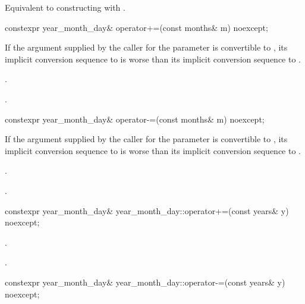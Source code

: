 \begin{itemdescr}
\pnum
\effects
Equivalent to constructing with .
\end{itemdescr}

%
\begin{itemdecl}
constexpr year_month_day& operator+=(const months& m) noexcept;
\end{itemdecl}

\begin{itemdescr}
\pnum
\constraints
If the argument supplied by the caller for the  parameter
is convertible to ,
its implicit conversion sequence to 
is worse than its implicit conversion sequence to
.

\pnum
\effects
{}.

\pnum
\returns
{}.
\end{itemdescr}

%
\begin{itemdecl}
constexpr year_month_day& operator-=(const months& m) noexcept;
\end{itemdecl}

\begin{itemdescr}
\pnum
\constraints
If the argument supplied by the caller for the  parameter
is convertible to ,
its implicit conversion sequence to 
is worse than its implicit conversion sequence to
.

\pnum
\effects
{}.

\pnum
\returns
{}.
\end{itemdescr}

%
\begin{itemdecl}
constexpr year_month_day& year_month_day::operator+=(const years& y) noexcept;
\end{itemdecl}

\begin{itemdescr}
\pnum
\effects
{}.

\pnum
\returns
{}.
\end{itemdescr}

%
\begin{itemdecl}
constexpr year_month_day& year_month_day::operator-=(const years& y) noexcept;
\end{itemdecl}

